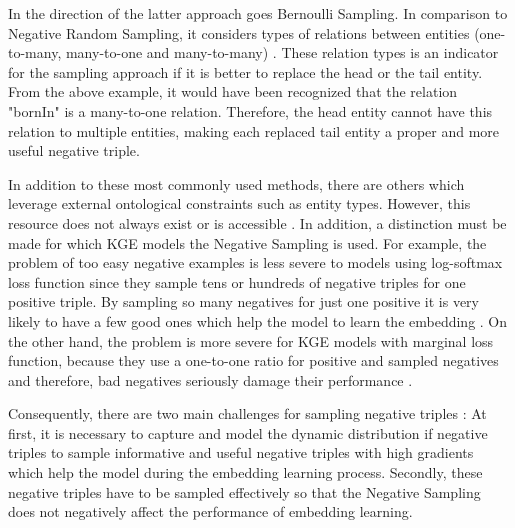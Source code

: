 In the direction of the latter approach goes Bernoulli Sampling.
In comparison to Negative Random Sampling, it considers types of relations between entities (one-to-many, many-to-one and many-to-many) \cite{zhang2021efficient}.
These relation types is an indicator for the sampling approach if it is better to replace the head or the tail entity.
From the above example, it would have been recognized that the relation "bornIn" is a many-to-one relation.
Therefore, the head entity cannot have this relation to multiple entities, making each replaced tail entity a proper and more useful negative triple.

In addition to these most commonly used methods, there are others which leverage external ontological constraints such as entity types.
However, this resource does not always exist or is accessible \cite{cai2017kbgan}.
In addition, a distinction must be made for which KGE models the Negative Sampling is used.
For example, the problem of too easy negative examples is less severe to models using log-softmax loss function since they sample tens or hundreds of negative triples for one positive triple.
By sampling so many negatives for just one positive it is very likely to have a few good ones which help the model to learn the embedding \cite{cai2017kbgan}.
On the other hand, the problem is more severe for KGE models with marginal loss function, because they use a one-to-one ratio for positive and sampled negatives and therefore, bad negatives seriously damage their performance \cite{cai2017kbgan}.

Consequently, there are two main challenges for sampling negative triples \cite{zhang2021efficient}:
At first, it is necessary to capture and model the dynamic distribution if negative triples to sample informative and useful negative triples with high gradients which help the model during the embedding learning process.
Secondly, these negative triples have to be sampled effectively  so that the Negative Sampling does not negatively affect the performance of embedding learning.


